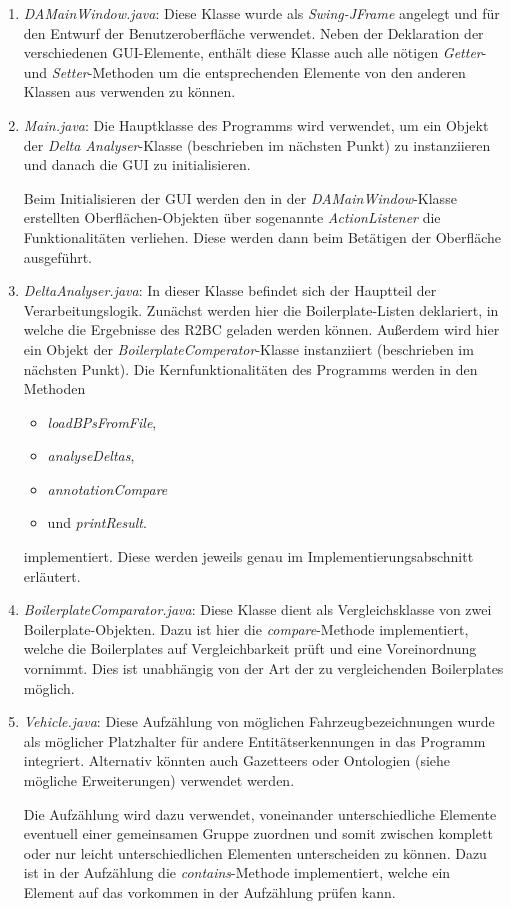 \documentclass[12pt]{report}
\begin{document}
\begin{enumerate}
\item \textit{DAMainWindow.java}: Diese Klasse wurde als \textit{Swing-JFrame} angelegt und für den Entwurf der Benutzeroberfläche verwendet. Neben der Deklaration der verschiedenen GUI-Elemente, enthält diese Klasse auch alle nötigen \textit{Getter}- und \textit{Setter}-Methoden um die entsprechenden Elemente von den anderen Klassen aus verwenden zu können.
\item \textit{Main.java}: Die Hauptklasse des Programms wird verwendet, um ein Objekt der \textit{Delta Analyser}-Klasse (beschrieben im nächsten Punkt) zu instanziieren und danach die GUI zu initialisieren.

Beim Initialisieren der GUI werden den in der \textit{DAMainWindow}-Klasse erstellten Oberflächen-Objekten über sogenannte \textit{ActionListener} die Funktionalitäten verliehen. Diese werden dann beim Betätigen der Oberfläche ausgeführt.
\item \textit{DeltaAnalyser.java}: In dieser Klasse befindet sich der Hauptteil der Verarbeitungslogik. Zunächst werden hier die Boilerplate-Listen deklariert, in welche die Ergebnisse des R2BC geladen werden können. Außerdem wird hier ein Objekt der \textit{BoilerplateComperator}-Klasse instanziiert (beschrieben im nächsten Punkt). 
Die Kernfunktionalitäten des Programms werden in den Methoden 
\begin{itemize}
\item \textit{loadBPsFromFile},
\item \textit{analyseDeltas},
\item \textit{annotationCompare}
\item und \textit{printResult}.
\end{itemize}
implementiert. Diese werden jeweils genau im Implementierungsabschnitt erläutert. 
\item \textit{BoilerplateComparator.java}: Diese Klasse dient als Vergleichsklasse von zwei Boilerplate-Objekten. Dazu ist hier die \textit{compare}-Methode implementiert, welche die Boilerplates auf Vergleichbarkeit prüft und eine Voreinordnung vornimmt. Dies ist unabhängig von der Art der zu vergleichenden Boilerplates möglich. 
\item \textit{Vehicle.java}: Diese Aufzählung von möglichen Fahrzeugbezeichnungen wurde als möglicher Platzhalter für andere Entitätserkennungen in das Programm integriert. Alternativ könnten auch Gazetteers oder Ontologien (siehe mögliche Erweiterungen) verwendet werden. 

Die Aufzählung wird dazu verwendet, voneinander unterschiedliche Elemente eventuell einer gemeinsamen Gruppe zuordnen und somit zwischen komplett oder nur leicht unterschiedlichen Elementen unterscheiden zu können. 
Dazu ist in der Aufzählung die \textit{contains}-Methode implementiert, welche ein Element auf das vorkommen in der Aufzählung prüfen kann.
\end{enumerate}
\end{document}
